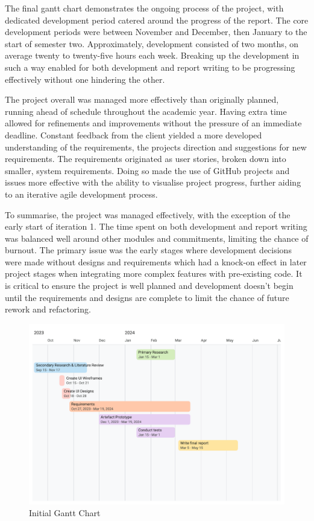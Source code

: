 The final gantt chart demonstrates the ongoing process of the project, with dedicated development period catered around the progress of the report. The core development periods were between November and December, then January to the start of semester two. Approximately, development consisted of two months, on average twenty to twenty-five hours each week. Breaking up the development in such a way enabled for both development and report writing to be progressing effectively without one hindering the other.

The project overall was managed more effectively than originally planned, running ahead of schedule throughout the academic year. Having extra time allowed for refinements and improvements without the pressure of an immediate deadline. Constant feedback from the client yielded a more developed understanding of the requirements, the projects direction and suggestions for new requirements. The requirements originated as user stories, broken down into smaller, system requirements. Doing so made the use of GitHub projects and issues more effective with the ability to visualise project progress, further aiding to an iterative agile development process.

To summarise, the project was managed effectively, with the exception of the early start of iteration 1. The time spent on both development and report writing was balanced well around other modules and commitments, limiting the chance of burnout. The primary issue was the early stages where development decisions were made without designs and requirements which had a knock-on effect in later project stages when integrating more complex features with pre-existing code. It is critical to ensure the project is well planned and development doesn't begin until the requirements and designs are complete to limit the chance of future rework and refactoring.

\begin{figure}[h!]
    \centering
    \includegraphics[width=1\linewidth]{figures/Old FYP Gantt - Timeline 1.pdf}
    \caption{Initial Gantt Chart}
    \label{fig:initial-gantt}
\end{figure}

